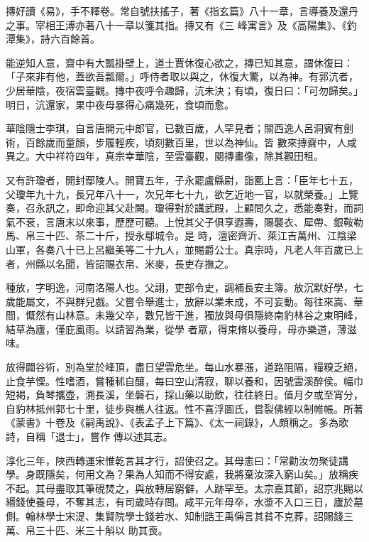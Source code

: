 \begin{pinyinscope}
 摶好讀《易》，手不釋卷。常自號扶搖子，著《指玄篇》八十一章，言導養及還丹之事。宰相王溥亦著八十一章以箋其指。摶又有《三
 峰寓言》及《高陽集》、《釣潭集》，詩六百餘首。



 能逆知人意，齋中有大瓢掛壁上，道士賈休復心欲之，摶已知其意，謂休復曰：「子來非有他，蓋欲吾瓢爾。」呼侍者取以與之，休復大驚，以為神。有郭沆者，少居華陰，夜宿雲臺觀。摶中夜呼令趣歸，沆未決；有頃，復日曰：「可勿歸矣。」明日，沆還家，果中夜母暴得心痛幾死，食頃而愈。



 華陰隱士李琪，自言唐開元中郎官，已數百歲，人罕見者；關西逸人呂洞賓有劍術，百餘歲而童顏，步履輕疾，頃刻數百里，世以為神仙。皆
 數來摶齋中，人咸異之。大中祥符四年，真宗幸華陰，至雲臺觀，閱摶畫像，除其觀田租。



 又有許瓊者，開封鄢陵人。開寶五年，子永罷盧縣尉，詣匭上言：「臣年七十五，父瓊年九十九，長兄年八十一，次兄年七十九，欲乞近地一官，以就榮養。」上覽奏，召永訊之，即命迎其父赴闕。瓊得對於講武殿，上顧問久之，悉能奏對，而詞氣不衰，言唐末以來事，歷歷可聽。上悅其父子俱享遐壽，賜襲衣、犀帶、銀鞍勒馬、帛三十匹、茶二十斤，授永鄢城令。是
 時，澶密齊沂、萊江吉萬州、江陰梁山軍，各奏八十已上呂繼美等二十九人，並賜爵公士。真宗時，凡老人年百歲已上者，州縣以名聞，皆詔賜衣帛、米麥，長吏存撫之。



 種放，字明逸，河南洛陽人也。父詡，吏部令史，調補長安主簿。放沉默好學，七歲能屬文，不與群兒戲。父嘗令舉進士，放辭以業未成，不可妄動。每往來嵩、華間，慨然有山林意。未幾父卒，數兄皆干進，獨放與母俱隱終南豹林谷之東明峰，結草為廬，僅庇風雨。以請習為業，從學
 者眾，得束脩以養母，母亦樂道，薄滋味。



 放得闢谷術，別為堂於峰頂，盡日望雲危坐。每山水暴漲，道路阻隔，糧糗乏絕，止食芋慄。性嗜酒，嘗種秫自釀，每曰空山清寂，聊以養和，因號雲溪醉侯。幅巾短褐，負琴攜壺，溯長溪，坐磐石，採山藥以助飲，往往終日。值月夕或至宵分，自豹林抵州郭七十里，徒步與樵人往返。性不喜浮圖氏，嘗裂佛經以制帷帳。所著《蒙書》十卷及《嗣禹說》、《表孟子上下篇》、《太一祠錄》，人頗稱之。多為歌詩，自稱「退士」，嘗作
 傳以述其志。



 淳化三年，陜西轉運宋惟乾言其才行，詔使召之。其母恚曰：「常勸汝勿聚徒講學。身既隱矣，何用文為？果為人知而不得安處，我將棄汝深入窮山矣。」放稱疾不起。其母盡取其筆硯焚之，與放轉居窮僻，人跡罕至。太宗嘉其節，詔京兆賜以緡錢使養母，不奪其志，有司歲時存問。咸平元年母卒，水漿不入口三日，廬於墓側。翰林學士宋湜、集賢院學士錢若水、知制誥王禹偁言其貧不克葬，詔賜錢三萬、帛三十匹、米三十斛以
 助其喪。




\end{pinyinscope}
